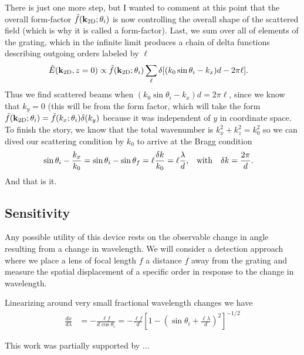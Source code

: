 \documentclass[letterpaper,preprint,aps,pra,superscriptaddress]{revtex4-1}
\begin{document}
There is just one more step, but I wanted to comment at this point that the overall form-factor $\tilde f({\bf k}_{\rm 2D};\theta_i)$ is now controlling the overall shape of the scattered field (which is why it is called a form-factor).  Last, we sum over all of elements of the grating, which in the infinite limit produces a chain of delta functions describing outgoing orders labeled by $\ell$
\begin{align}
\tilde E({\bf k}_{\rm 2D},z=0) &\propto \tilde f({\bf k}_{\rm 2D};\theta_i) \sum_\ell \delta[(k_0 \sin\theta_i - k_x) d - 2\pi\ell].
\end{align}
Thus we find scattered beams when $(k_0 \sin\theta_i - k_x) d = 2\pi\ell$, since we know that $k_y=0$ (this will be from the form factor, which will take the form $\tilde f({\bf k}_{\rm 2D};\theta_i) = \tilde f(k_x;\theta_i) \delta(k_y)$ because it was independent of $y$ in coordinate space.  To finish the story, we know that the total wavenumber is $k_x^2 + k_z^2 = k_0^2$ so we can dived our scattering condition by $k_0$ to arrive at the Bragg condition
\begin{align}
\sin\theta_i - \frac{k_x}{k_0} =\sin\theta_i - \sin\theta_f &= \ell \frac{\delta k}{k_0} = \ell\frac{\lambda}{d}, & {\rm with} && \delta k &= \frac{2\pi}{d}.
\end{align}
And that is it.

\subsection{Sensitivity}

Any possible utility of this device rests on the observable change in angle resulting from a change in wavelength.  We will consider a detection approach where we place a lens of focal length $f$ a distance $f$ away from the grating and measure the spatial displacement of a specific order in response to the change in wavelength. 

Linearizing around very small fractional wavelength changes we have
\begin{align}
\frac{d x}{d \lambda} &= -\frac{\ell f}{d\cos\theta_i} = -\frac{\ell f}{d}\left[1-\left(\sin\theta_i+\frac{\ell \lambda}{d}\right)^2\right]^{-1/2}
\end{align}


\begin{acknowledgments}
This work was partially supported by ...
\end{acknowledgments}


% 
\end{document}
